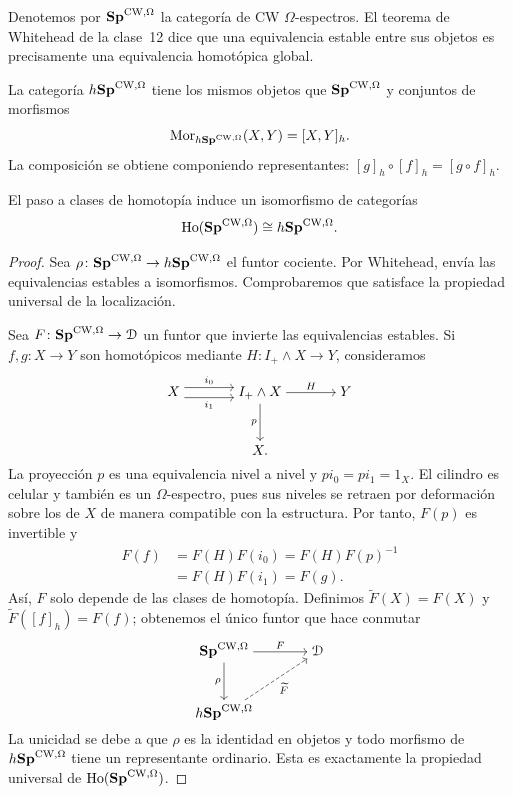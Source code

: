 Denotemos por $\mathbf{Sp}^{\mathrm{CW},\Omega}$ la categoría de CW $\Omega$-espectros. El teorema de Whitehead de la clase~12 dice que una equivalencia estable entre sus objetos es precisamente una equivalencia homotópica global.

\begin{defi}
La categoría $h\mathbf{Sp}^{\mathrm{CW},\Omega}$ tiene los mismos objetos que $\mathbf{Sp}^{\mathrm{CW},\Omega}$ y conjuntos de morfismos
\[
\operatorname{Mor}_{h\mathbf{Sp}^{\mathrm{CW},\Omega}}(X,Y)=[X,Y]_h.
\]
La composición se obtiene componiendo representantes: $[g]_h\circ[f]_h=[g\circ f]_h$.
\end{defi}

\begin{teo}\label{teo:c13-localizacion-global}
El paso a clases de homotopía induce un isomorfismo de categorías
\[
\operatorname{Ho}(\mathbf{Sp}^{\mathrm{CW},\Omega})\cong h\mathbf{Sp}^{\mathrm{CW},\Omega}.
\]
\end{teo}
\begin{proof}
Sea $\rho\colon\mathbf{Sp}^{\mathrm{CW},\Omega}\to h\mathbf{Sp}^{\mathrm{CW},\Omega}$ el funtor cociente. Por Whitehead, envía las equivalencias estables a isomorfismos. Comprobaremos que satisface la propiedad universal de la localización.

Sea $F\colon\mathbf{Sp}^{\mathrm{CW},\Omega}\to\mathcal D$ un funtor que invierte las equivalencias estables. Si $f,g\colon X\to Y$ son homotópicos mediante $H\colon I_+\wedge X\to Y$, consideramos
\[
\begin{tikzcd}[cramped,column sep=large,row sep=large]
X \arrow[r,shift left=1.5,"i_0"] \arrow[r,shift right=1.5,"i_1"']
& I_+\wedge X \arrow[r,"H"] \arrow[d,"p"'] & Y\\
& X. &
\end{tikzcd}
\]
La proyección $p$ es una equivalencia nivel a nivel y $pi_0=pi_1=1_X$. El cilindro es celular y también es un $\Omega$-espectro, pues sus niveles se retraen por deformación sobre los de $X$ de manera compatible con la estructura. Por tanto, $F(p)$ es invertible y
\[
\begin{aligned}
F(f)&=F(H)F(i_0)=F(H)F(p)^{-1}\\
&=F(H)F(i_1)=F(g).
\end{aligned}
\]
Así, $F$ solo depende de las clases de homotopía. Definimos $\widetilde F(X)=F(X)$ y $\widetilde F([f]_h)=F(f)$; obtenemos el único funtor que hace conmutar
\[
\begin{tikzcd}[cramped,column sep=large,row sep=large]
\Sp^{\mathrm{CW},\Omega} \arrow[r,"F"] \arrow[d,"\rho"'] & \mathcal D\\
h\Sp^{\mathrm{CW},\Omega} \arrow[ur,dashed,"\widetilde F"'] &
\end{tikzcd}
\]
La unicidad se debe a que $\rho$ es la identidad en objetos y todo morfismo de $h\mathbf{Sp}^{\mathrm{CW},\Omega}$ tiene un representante ordinario. Esta es exactamente la propiedad universal de $\operatorname{Ho}(\mathbf{Sp}^{\mathrm{CW},\Omega})$.
\end{proof}

